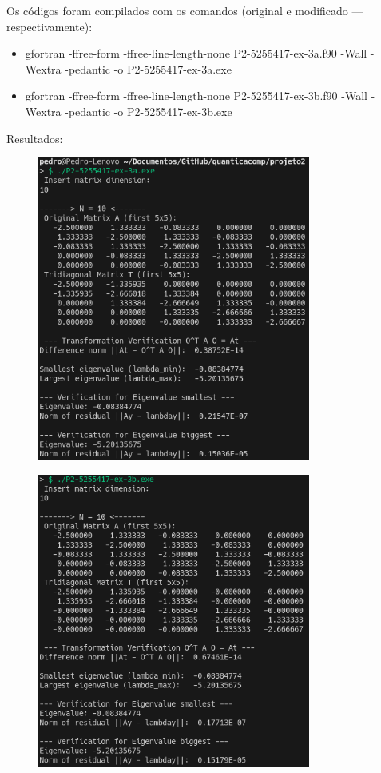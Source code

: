 \documentclass[12pt, a4paper]{article} %
\begin{document}
        Os c\'odigos foram compilados com os comandos (original e modificado --- respectivamente):

        \begin{itemize}
            \item gfortran -ffree-form -ffree-line-length-none P2-5255417-ex-3a.f90 -Wall -Wextra -pedantic -o P2-5255417-ex-3a.exe

            \item gfortran -ffree-form -ffree-line-length-none P2-5255417-ex-3b.f90 -Wall -Wextra -pedantic -o P2-5255417-ex-3b.exe
        \end{itemize}
                
        Resultados:

        \begin{figure}[H]
            \centering
            \includegraphics[width=0.8\textwidth]{../images/ex3a-10.png}
        \end{figure}
        \begin{figure}[H]
            \centering
            \includegraphics[width=0.8\textwidth]{../images/ex3b-10.png}
        \end{figure}
\end{document}
